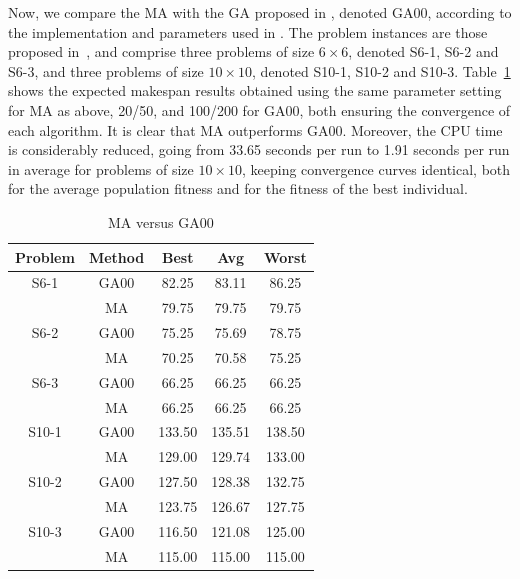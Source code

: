 \documentclass[letterpaper]{article}
\begin{document}
Now, we compare the MA with the GA proposed in \cite{Sakawa2000}, denoted GA00, according to the implementation and parameters used in \cite{GonzalezRodriguez2008}. The problem instances are those proposed in~\cite{Sakawa2000}, and comprise three problems of size $6\times6$, denoted S6-1, S6-2 and S6-3, and three problems of size $10\times10$, denoted S10-1, S10-2 and S10-3. Table~\ref{tabMAvsGASakawa} shows the expected makespan results obtained using the same parameter setting for MA as above, 20/50, and 100/200 for GA00, both ensuring the convergence of each algorithm. It is clear that MA outperforms GA00. Moreover, the CPU time is considerably reduced, going from 33.65 seconds per run to 1.91 seconds per run in average for problems of size $10\times10$, keeping convergence curves identical, both for the average population fitness and for the fitness of the best individual.
\begin{table}[htb]
\caption{\label{tabMAvsGASakawa}MA versus GA00}
\centering
\begin{tabular}{c|c|ccc}
\hline\hline
Problem & Method & Best & Avg & Worst \\
\hline\hline
 S6-1 & GA00 & 82.25 & 83.11 & 86.25  \\
      & MA & 79.75 & 79.75 & 79.75 \\
      \hline
 S6-2 & GA00 & 75.25 & 75.69 & 78.75  \\
      & MA & 70.25 & 70.58 & 75.25 \\
       \hline
 S6-3 &  GA00 & 66.25 & 66.25 & 66.25  \\
      & MA & 66.25 & 66.25 & 66.25 \\
       \hline

 S10-1 & GA00 & 133.50 & 135.51 & 138.50 \\
       & MA & 129.00 & 129.74 & 133.00  \\
        \hline
 S10-2 & GA00 & 127.50 & 128.38 & 132.75  \\
       & MA & 123.75 & 126.67 & 127.75 \\
        \hline
 S10-3 & GA00 & 116.50 & 121.08 & 125.00 \\
       & MA & 115.00 & 115.00 & 115.00 \\
 \hline\hline
\end{tabular}
\end{table}
\end{document}
